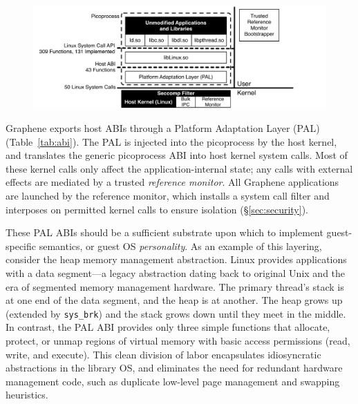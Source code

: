 \begin{figure}[t!]
\centering
\includegraphics[width=0.9\linewidth]{graphene/figures/arch.pdf}
\caption{
\label{fig:arch}}
\end{figure}


Graphene exports \palcalls{} host ABIs through a 
Platform Adaptation Layer (PAL) (Table~\ref{tab:abi}).
The PAL is injected into the picoprocess by the host kernel, 
and translates the generic picoprocess ABI into host kernel system calls.
Most of these kernel calls only affect the application-internal state;
any calls with external effects are mediated by a trusted {\em reference 
monitor}.  
All Graphene applications are launched by the reference monitor,
which installs a system call filter and interposes on permitted kernel calls to ensure isolation
(\S\ref{sec:security}).


These PAL ABIs should be a sufficient substrate upon which to
implement guest-specific semantics, or guest OS {\em personality}.
As an example of this layering, consider the heap memory management abstraction.
Linux provides applications with a data segment---a 
legacy abstraction dating back to original Unix and the era 
of segmented memory management hardware.
The primary thread's stack is at one end of the data segment, and the heap is at another.  
The heap grows up (extended by {\tt sys\_brk}) 
and the stack grows down until they meet in the middle.
In contrast, the PAL ABI provides only three simple functions 
that allocate, protect, or unmap regions of virtual memory
with basic access permissions (read, write, and execute).
This clean division of labor encapsulates 
idiosyncratic abstractions in the library OS,
and eliminates the need for
redundant hardware management code, 
such as duplicate low-level page management and swapping heuristics.


